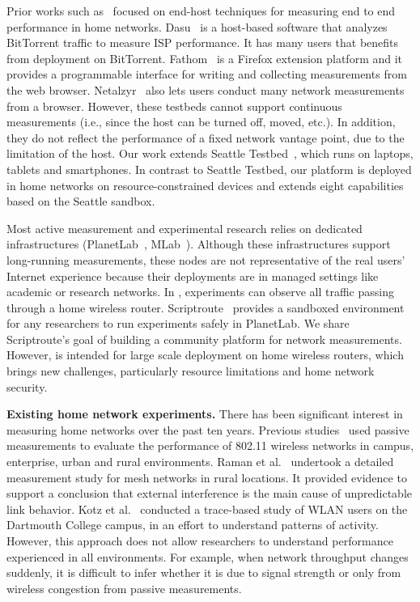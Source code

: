 Prior works such as~\cite{sanchez2014measurement,dhawan2012fathom,kreibich2010netalyzr} focused on end-host techniques for measuring end to end performance in home networks. Dasu~\cite{sanchez2014measurement} is a host-based software that analyzes BitTorrent traffic to measure ISP performance. It has many users that benefits from deployment on BitTorrent. Fathom~\cite{dhawan2012fathom} is a Firefox extension platform and it provides a programmable interface for writing and collecting measurements from the web browser. Netalzyr~\cite{kreibich2010netalyzr} also lets users conduct many network measurements from a browser. However, these testbeds cannot support continuous measurements (i.e., since the host can be turned off, moved, etc.). In addition, they do not reflect the performance of a fixed network vantage point, due to the limitation of the host. Our work extends Seattle Testbed~\cite{cappos2009seattle}, which runs on laptops, tablets and smartphones. In contrast to Seattle Testbed, our platform is deployed in home networks on resource-constrained devices and extends eight capabilities based on the Seattle sandbox.

Most active measurement and experimental research relies on dedicated infrastructures (PlanetLab~\cite{chun2003planetlab}, MLab~\cite{mlab}). Although these infrastructures support long-running measurements, these nodes are not representative of the real users' Internet experience because their deployments are in managed settings like academic or research networks. In \sysname, experiments can observe all traffic passing through a home wireless router. Scriptroute~\cite{spring2003scriptroute} provides a sandboxed environment for any researchers to run experiments safely in PlanetLab. We share Scriptroute's goal of building a community platform for network measurements. However, \sysname is intended for large scale deployment on home wireless routers, which brings new challenges, particularly resource limitations and home network security.

\textbf{Existing home network experiments.} There has been significant interest in measuring home networks over the past ten years. Previous studies~\cite{aguayo2004link,kotz2005analysis,raman2009feasibility} used passive measurements to evaluate the performance of 802.11 wireless networks in campus, enterprise, urban and rural environments. Raman et al.~\cite{raman2009feasibility} undertook a detailed measurement study for mesh networks in rural locations. It provided evidence to support a conclusion that external interference is the main cause of unpredictable link behavior. Kotz et al.~\cite{kotz2005analysis} conducted a trace-based study of WLAN users on the Dartmouth College campus, in an effort to understand patterns of activity. However, this approach does not allow researchers to understand performance experienced in all environments. For example, when network throughput changes suddenly, it is difficult to infer whether it is due to signal strength or only from wireless congestion from passive measurements.


